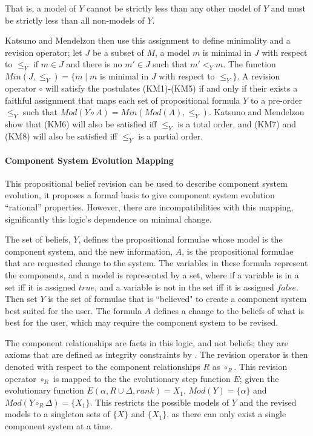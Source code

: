 That is, a model of $Y$ cannot be strictly less than any other model of $Y$ and must be strictly less than all non-models of $Y$.

Katsuno and Mendelzon then use this assignment to define minimality and a revision operator; 
let $J$ be a subset of $M$, 
a model $m$ is minimal in $J$ with respect to $\leq_{Y}$ if $m \in J$ and there is no $m' \in J$ such that $m' <_Y m$. 
The function $Min(J,\leq_{Y}) = \{ m \mid m$ is minimal in $J$ with respect to $\leq_{Y} \}$.
A revision operator $\circ$ will satisfy the postulates (KM1)-(KM5) if and only if
their exists a faithful assignment that maps each set of propositional formula $Y$ to a pre-order $\leq_{Y}$
such that $Mod(Y \circ A) = Min(Mod(A),\leq_{Y})$.
Katsuno and Mendelzon show that (KM6) will also be satisfied iff $\leq_{Y}$ is a total order,
and (KM7) and (KM8) will also be satisfied iff $\leq_{Y}$ is a partial order.

\paragraph{Component System Evolution Mapping}
This propositional belief revision can be used to describe component system evolution, it proposes a formal basis to give component system evolution ``rational'' properties.
However, there are incompatibilities with this mapping, significantly this logic's dependence on minimal change.

The set of beliefs, $Y$, defines the propositional formulae whose model is the component system,
and the new information, $A$, is the propositional formulae that are requested change to the system.
The variables in these formula represent the components, and a model is represented by a set, where if a variable is in a set iff it is assigned $true$, 
and a variable is not in the set iff it is assigned $false$. 
Then set $Y$ is the set of formulae that is ``believed" to create a component system best suited for the user.
The formula $A$ defines a change to the beliefs of what is best for the user, which may require the component system to be revised.

The component relationships are facts in this logic, and not beliefs; they are axioms that are defined as integrity constraints by \cite{katsuno1991propositional}.
The revision operator is then denoted with respect to the component relationships $R$ as $\circ_R$.
This revision operator $\circ_R$ is mapped to the the evolutionary step function $E$;
given the evolutionary function $E(\alpha,R \cup \Delta,rank) = X_1$, $Mod(Y) = \{\alpha\}$ and $Mod(Y \circ_{R} \Delta) = \{X_1\}$.
This restricts the possible models of $Y$ and the revised models to a singleton sets of $\{X\}$ and $\{X_1\}$,
as there can only exist a single component system at a time.

